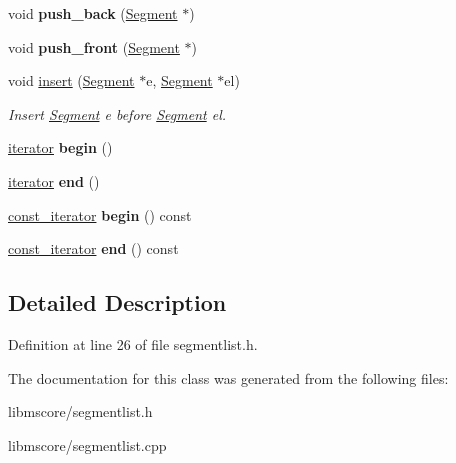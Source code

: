 \begin{DoxyCompactItemize}
\mbox{\label{class_ms_1_1_segment_list_af65d20a9f590f21dc45b7621d8420719}} 
void {\bfseries push\+\_\+back} (\hyperlink{class_ms_1_1_segment}{Segment} $\ast$)
\item 
\mbox{\label{class_ms_1_1_segment_list_a295d1d590437004d4b3def75bacfcaf7}} 
void {\bfseries push\+\_\+front} (\hyperlink{class_ms_1_1_segment}{Segment} $\ast$)
\item 
\mbox{\label{class_ms_1_1_segment_list_a32613dcb9dd88406f7994b6d46c65d2d}} 
void \hyperlink{class_ms_1_1_segment_list_a32613dcb9dd88406f7994b6d46c65d2d}{insert} (\hyperlink{class_ms_1_1_segment}{Segment} $\ast$e, \hyperlink{class_ms_1_1_segment}{Segment} $\ast$el)
\begin{DoxyCompactList}\small\item\em Insert \hyperlink{class_ms_1_1_segment}{Segment} {\itshape e} before \hyperlink{class_ms_1_1_segment}{Segment} {\itshape el}. \end{DoxyCompactList}\item 
\mbox{\label{class_ms_1_1_segment_list_a57cab05b0ff5a3acb87f181f9ef13363}} 
\hyperlink{class_ms_1_1_segment_list_1_1iterator}{iterator} {\bfseries begin} ()
\item 
\mbox{\label{class_ms_1_1_segment_list_a3f02db92ae795db772ee7d135e70a367}} 
\hyperlink{class_ms_1_1_segment_list_1_1iterator}{iterator} {\bfseries end} ()
\item 
\mbox{\label{class_ms_1_1_segment_list_a101c8c102201035e895b5ae8d9dcd134}} 
\hyperlink{class_ms_1_1_segment_list_1_1const__iterator}{const\+\_\+iterator} {\bfseries begin} () const
\item 
\mbox{\label{class_ms_1_1_segment_list_a246e40058edc4292b584b496b6d1bfa5}} 
\hyperlink{class_ms_1_1_segment_list_1_1const__iterator}{const\+\_\+iterator} {\bfseries end} () const
\end{DoxyCompactItemize}


\subsection{Detailed Description}


Definition at line 26 of file segmentlist.\+h.



The documentation for this class was generated from the following files\+:\begin{DoxyCompactItemize}
\item 
libmscore/segmentlist.\+h\item 
libmscore/segmentlist.\+cpp\end{DoxyCompactItemize}

